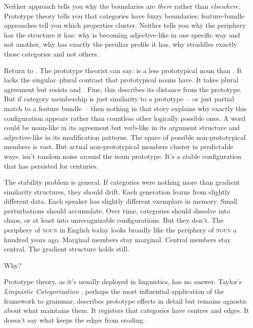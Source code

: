Neither approach tells you why the boundaries are \emph{there} rather than \emph{elsewhere}. Prototype theory tells you that categories have fuzzy boundaries; feature-bundle approaches tell you which properties cluster. Neither tells you why the periphery has the structure it has: why  is becoming adjective-like in one specific way and not another, why  has exactly the peculiar profile it has, why  straddles exactly those categories and not others.

Return to . The prototype theorist can say:  is a less prototypical noun than . It lacks the singular–plural contrast that prototypical nouns have. It takes plural agreement but resists  and . Fine, this describes its distance from the prototype. But if category membership is just similarity to a prototype~-- or just partial match to a feature bundle~-- then nothing in that story explains why exactly this configuration appears rather than countless other logically possible ones. A word could be noun-like in its agreement but verb-like in its argument structure and adjective-like in its modification patterns. The space of possible non-prototypical members is vast. But actual non-prototypical members cluster in predictable ways.  isn't random noise around the noun prototype. It's a stable configuration that has persisted for centuries.

The stability problem is general. If categories were nothing more than gradient similarity structures, they should drift. Each generation learns from slightly different data. Each speaker has slightly different exemplars in memory. Small perturbations should accumulate. Over time, categories should dissolve into chaos, or at least into unrecognizable configurations. But they don't. The periphery of \textsc{noun} in English today looks broadly like the periphery of \textsc{noun} a hundred years ago. Marginal members stay marginal. Central members stay central. The gradient structure holds still.

Why?

Prototype theory, as it's usually deployed in linguistics, has no answer. Taylor's \textit{Linguistic Categorization} \citep{taylor2003}, perhaps the most influential application of the framework to grammar, describes prototype effects in detail but remains agnostic about what maintains them. It registers that categories have centres and edges. It doesn't say what keeps the edges from eroding.

